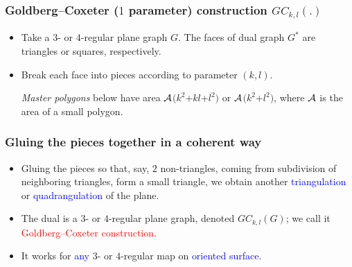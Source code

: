 \documentclass{beamer}
\begin{document}
\begin{frame}\frametitle{Goldberg--Coxeter ($1$ parameter) construction $GC_{k,l}(.)$}
\vspace{-2.5mm}
\begin{itemize}
\item Take a $3$- or $4$-regular plane graph $G$. The faces of dual graph 
$G^{*}$ are triangles or squares, respectively.
\item Break each face
into pieces according to parameter 
$(k,l)$.

{\em Master polygons}
below have area $\cal{A}$$(k^2$+$kl$+$l^2)$ or $\cal{A}$$(k^2$+$l^2)$, where  $\cal{A}$ is the area of 
 a small 
polygon.
\end{itemize}
\begin{center}
\end{center}

\end{frame}
\begin{frame}\frametitle{Gluing the pieces together in a coherent way}
\vspace{-2.5mm}
\begin{itemize}
\item Gluing the pieces so that, say, $2$ non-triangles, coming from  
subdivision 
of neighboring triangles, form a small triangle,
we obtain 
another \textcolor{blue}{triangulation} or 
\textcolor{blue}{quadrangulation} of the plane.
\end{itemize}
\begin{center}
\centering
{}
\end{center}   
\begin{itemize} 
\item The dual is  a $3$- or $4$-regular plane graph,  
 denoted $GC_{k,l}(G)$; we call it \textcolor{red}{Goldberg--Coxeter construction}.
\item It 
works for \textcolor{blue}{any} $3$- or $4$-regular  map on 
\textcolor{blue}{oriented surface}.
\end{itemize}  
\end{frame}
\end{document}
